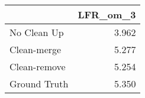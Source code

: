 \begin{tabular}{lr}
\toprule
{} & LFR_om_3 \\
\midrule
No Clean Up  &    3.962 \\
Clean-merge  &    5.277 \\
Clean-remove &    5.254 \\
Ground Truth &    5.350 \\
\bottomrule
\end{tabular}
